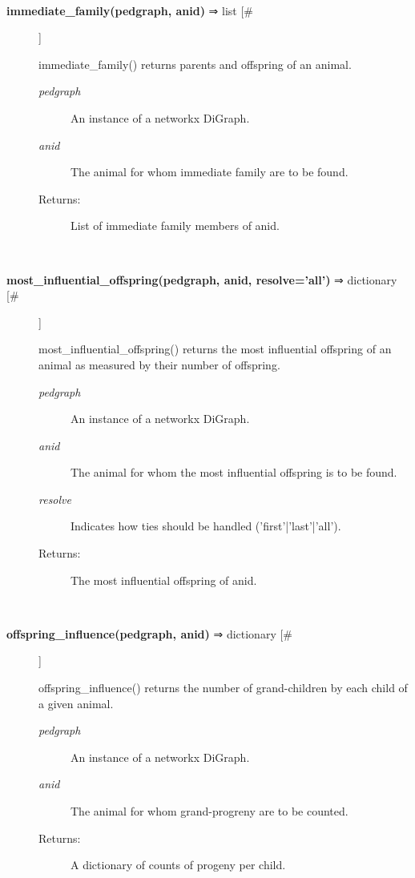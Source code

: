 \documentclass[10pt]{article}
\begin{document}
\begin{description}
\begin{description}
\end{description}
\\ 

\item[\textbf{immediate\_family(pedgraph, anid)}
 ⇒ list [\#]]

 immediate\_family() returns parents and offspring of an animal.
\begin{description}
\item[\emph{pedgraph}
] An instance of a networkx DiGraph.
\item[\emph{anid}
] The animal for whom immediate family are to be found.
\item[Returns:] List of immediate family members of anid.

\end{description}
\\ 

\item[\textbf{most\_influential\_offspring(pedgraph, anid, resolve='all')}
 ⇒ dictionary [\#]]

 most\_influential\_offspring() returns the most influential offspring of an animal as measured by their number of offspring.
\begin{description}
\item[\emph{pedgraph}
] An instance of a networkx DiGraph.
\item[\emph{anid}
] The animal for whom the most influential offspring is to be found.
\item[\emph{resolve}
] Indicates how ties should be handled ('first'|'last'|'all').
\item[Returns:] The most influential offspring of anid.

\end{description}
\\ 

\item[\textbf{offspring\_influence(pedgraph, anid)}
 ⇒ dictionary [\#]]

 offspring\_influence() returns the number of grand-children by each child of a given animal.
\begin{description}
\item[\emph{pedgraph}
] An instance of a networkx DiGraph.
\item[\emph{anid}
] The animal for whom grand-progreny are to be counted.
\item[Returns:] A dictionary of counts of progeny per child.

\end{description}
\\ 


\end{description}
\end{document}
